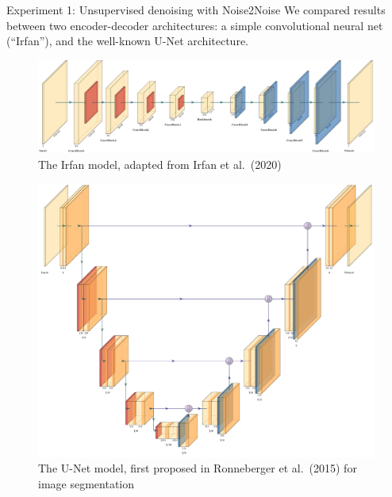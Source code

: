 \documentclass[]{beamer}
\begin{document}
\begin{frame}{Experiment 1: Unsupervised denoising with Noise2Noise}
    We compared results between two encoder-decoder architectures: a simple convolutional neural net (``Irfan''), and the well-known U-Net architecture. 
    
    \vspace{0.75cm} 
    
    \begin{figure}
        \scriptsize
        \captionsetup{font=scriptsize}
        \centering
        \includegraphics[width=\linewidth]{img/irfan.pdf}
        \caption{The Irfan model, adapted from Irfan et al.~(2020)}
     \end{figure}
\end{frame}

\begin{frame}[plain]{}
     \begin{figure}
        \scriptsize
        \captionsetup{font=scriptsize}
        \centering
        \includegraphics[width=0.9\linewidth]{img/unet.pdf}
        \caption{The U-Net model, first proposed in Ronneberger et al.~(2015) for image segmentation}
     \end{figure}
\end{frame}
\end{document}
